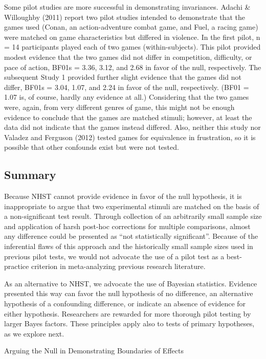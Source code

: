 \documentclass{article}
\begin{document}
Some pilot studies are more successful in demonstrating invariances. Adachi \& Willoughby (2011) report two pilot studies intended to demonstrate that the games used (Conan, an action-adventure combat game, and Fuel, a racing game) were matched on game characteristics but differed in violence. In the first pilot, n = 14 participants played each of two games (within-subjects). This pilot provided modest evidence that the two games did not differ in competition, difficulty, or pace of action, BF01s = 3.36, 3.12, and 2.68 in favor of the null, respectively. The subsequent Study 1 provided further slight evidence that the games did not differ, BF01s = 3.04, 1.07, and 2.24 in favor of the null, respectively. (BF01 = 1.07 is, of course, hardly any evidence at all.) Considering that the two games were, again, from very different genres of game, this might not be enough evidence to conclude that the games are matched stimuli; however, at least the data did not indicate that the games instead differed. Also, neither this study nor Valadez and Ferguson (2012) tested games for equivalence in frustration, so it is possible that other confounds exist but were not tested.

\subsection{Summary}
Because NHST cannot provide evidence in favor of the null hypothesis, it is inappropriate to argue that two experimental stimuli are matched on the basis of a non-significant test result. Through collection of an arbitrarily small sample size and application of harsh post-hoc corrections for multiple comparisons, almost any difference could be presented as “not statistically significant”. Because of the inferential flaws of this approach and the historically small sample sizes used in previous pilot tests, we would not advocate the use of a pilot test as a best-practice criterion in meta-analyzing previous research literature.
 
As an alternative to NHST, we advocate the use of Bayesian statistics. Evidence presented this way can favor the null hypothesis of no difference, an alternative hypothesis of a confounding difference, or indicate an absence of evidence for either hypothesis. Researchers are rewarded for more thorough pilot testing by larger Bayes factors. These principles apply also to tests of primary hypotheses, as we explore next.

Arguing the Null in Demonstrating Boundaries of Effects
\end{document}
